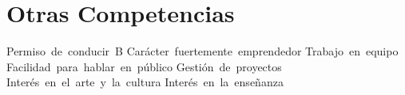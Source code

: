 \documentclass[11pt,a4paper,sans,spanish]{moderncv}
\begin{document}
\section{Otras Competencias}
Permiso~de~conducir~B \quad{} Carácter~fuertemente~emprendedor \quad{} Trabajo~en~equipo \quad{} Facilidad~para~hablar~en~público \quad{} Gestión~de~proyectos \quad{} Interés~en~el~arte~y~la~cultura \quad{} Interés~en~la~enseñanza
\end{document}
